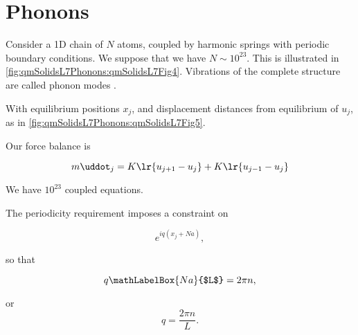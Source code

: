 %
%
\section{Phonons}

Consider a 1D chain of $N$ atoms, coupled by harmonic springs  with periodic boundary conditions.  We suppose that we have $N \sim 10^{23}$.  This is illustrated in \cref{fig:qmSolidsL7Phonons:qmSolidsL7Fig4}.  Vibrations of the complete structure are called phonon modes .


With equilibrium positions $x_j$, and displacement distances from equilibrium of $u_j$, as in \cref{fig:qmSolidsL7Phonons:qmSolidsL7Fig5}.


Our force balance is

\begin{dmath}\label{eqn:condensedMatterLecture7Phonons:180}
m \uddot_j = K \lr{ u_{j + 1} - u_j } + K \lr{ u_{j - 1} - u_j} 
\end{dmath}

We have $10^{23}$ coupled equations.

The periodicity requirement imposes a constraint on

\begin{dmath}\label{eqn:condensedMatterLecture7Phonons:220}
e^{i q( x_j + N a) },
\end{dmath}

so that 

\begin{dmath}\label{eqn:condensedMatterLecture7Phonons:240}
q \mathLabelBox{N a}{$L$} = 2 \pi n,
\end{dmath}

or
\begin{dmath}\label{eqn:condensedMatterLecture7Phonons:260}
q = \frac{2 \pi n}{L}.
\end{dmath}

